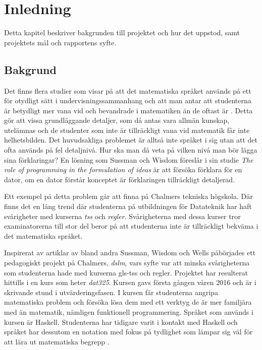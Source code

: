 \documentclass[12pt,a4paper,twoside,openright]{article}
\begin{document}
\section{Inledning}
Detta kapitel beskriver bakgrunden till projektet och hur det
uppstod, samt projektets mål och rapportens syfte.

\subsection{Bakgrund}
\label{sec:bakgrund}
%

Det finns flera studier som visar på att det matematiska språket
används på ett för otydligt sätt i undervisningssammanhang och att man
antar att studenterna är betydligt mer vana vid och bevandrade i
matematiken än de oftast är \cite{sussman2002role}
\cite{wells1995communicating}. Detta gör att vissa grundläggande
detaljer, som då antas vara allmän kunskap, utelämnas och de studenter
som inte är tillräckligt vana vid matematik får inte helhetsbilden.
Det huvudsakliga problemet är alltså inte språket i sig utan att det
ofta används på fel detaljnivå. Hur ska man då veta på vilken nivå man
bör lägga sina förklaringar? En lösning som Sussman och Wisdom
föreslår i sin studie \textit{The role of programming in the
  formulation of ideas} \cite{sussman2002role} är att försöka förklara
för en dator, om en dator förstår konceptet är förklaringen
tillräckligt detaljerad.

Ett exempel på detta problem går att finna på Chalmers tekniska
högskola. Där finns det en lång trend där studenterna på utbildningen
för Datateknik har haft svårigheter med kurserna \textit{\gls{tss}}
och \textit{\gls{regler}}. Svårigheterna med dessa kurser tror
examinatorerna till stor del beror på att studenterna inte är
tillräckligt bekväma i det matematiska språket.

Inspirerat av artiklar av bland andra Sussman, Wisdom och Wells
påbörjades ett pedagogiskt projekt på Chalmers, \textit{\gls{dslm}},
vars syfte var att minska svårigheterna som studenterna hade med
kurserna \gls{gls-tss} och \gls{regler}. Projektet har resulterat
hittills i en kurs som heter \textit{\gls{dat325}}. Kursen gavs första
gången våren 2016 och är i skrivande stund i utvärderingsfasen. I
kursen får studenterna angripa matematiska problem och försöka lösa
dem med ett verktyg de är mer familjära med än matematik, nämligen
funktionell programmering. Språket som används i kursen är
Haskell. Studenterna har tidigare varit i kontakt med Haskell och
språket har dessutom en notation med fokus på tydlighet som lämpar sig
väl för att lära ut matematiska begrepp
\cite{TFPIE15_DSLsofMath_IonescuJansson}.
\end{document}
